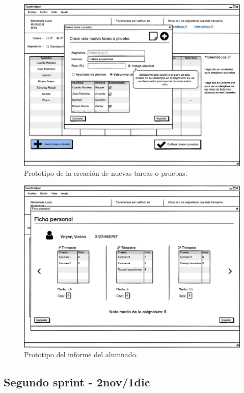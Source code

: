 \begin{figure}[h]
\centering\includegraphics[width=1\linewidth]{figs/mockup_nuevatarea.png}
\caption{Prototipo de la creación de nuevas tareas o pruebas.}
\label{Fig:mockup_nuevatarea}
\end{figure}

\begin{figure}[h]
\centering\includegraphics[width=1\linewidth]{figs/mockup_informealumno.png}
\caption{Prototipo del informe del alumnado.}
\label{Fig:mockup_informealumno}
\end{figure}


\subsection{Segundo sprint - 2nov/1dic}

